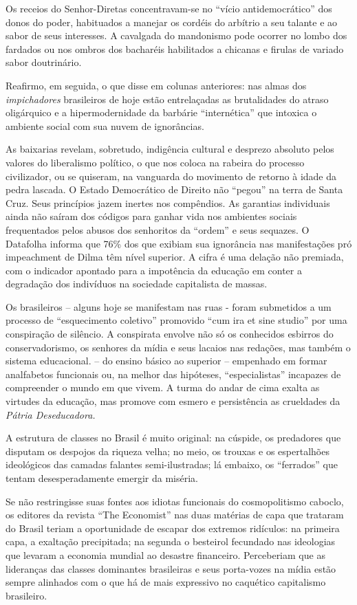 Os receios do Senhor-Diretas concentravam-se no ``vício
antidemocrático'' dos donos do poder, habituados a manejar os cordéis do
arbítrio a seu talante e ao sabor de seus interesses. A cavalgada do
mandonismo pode ocorrer no lombo dos fardados ou nos ombros dos
bacharéis habilitados a chicanas e firulas de variado sabor doutrinário.

Reafirmo, em seguida, o que disse em colunas anteriores: nas almas dos
\emph{impichadores} brasileiros de hoje estão entrelaçadas as
brutalidades do atraso oligárquico e a hipermodernidade da barbárie
``internética'' que intoxica o ambiente social com sua nuvem de
ignorâncias.

As baixarias revelam, sobretudo, indigência cultural e desprezo absoluto
pelos valores do liberalismo político, o que nos coloca na rabeira do
processo civilizador, ou se quiseram, na vanguarda do movimento de
retorno à idade da pedra lascada. O Estado Democrático de Direito não
``pegou'' na terra de Santa Cruz. Seus princípios jazem inertes nos
compêndios. As garantias individuais ainda não saíram dos códigos para
ganhar vida nos ambientes sociais frequentados pelos abusos dos
senhoritos da ``ordem'' e seus sequazes. O Datafolha informa que 76\%
dos que exibiam sua ignorância nas manifestações pró impeachment de
Dilma têm nível superior. A cifra é uma delação não premiada, com o
indicador apontado para a impotência da educação em conter a degradação
dos indivíduos na sociedade capitalista de massas.

Os brasileiros -- alguns hoje se manifestam nas ruas - foram submetidos
a um processo de ``esquecimento coletivo'' promovido ``cum ira et sine
studio'' por uma conspiração de silêncio. A conspirata envolve não só os
conhecidos esbirros do conservadorismo, os senhores da mídia e seus
lacaios nas redações, mas também o sistema educacional. -- do ensino
básico ao superior -- empenhado em formar analfabetos funcionais ou, na
melhor das hipóteses, ``especialistas'' incapazes de compreender o mundo
em que vivem. A turma do andar de cima exalta as virtudes da educação,
mas promove com esmero e persistência as crueldades da \emph{Pátria
Deseducadora.}

A estrutura de classes no Brasil é muito original: na cúspide, os
predadores que disputam os despojos da riqueza velha; no meio, os
trouxas e os espertalhões ideológicos das camadas falantes
semi-ilustradas; lá embaixo, os ``ferrados'' que tentam desesperadamente
emergir da miséria.

Se não restringisse suas fontes aos idiotas funcionais do cosmopolitismo
caboclo, os editores da revista ``The Economist'' nas duas matérias de
capa que trataram do Brasil teriam a oportunidade de escapar dos
extremos ridículos: na primeira capa, a exaltação precipitada; na
segunda o besteirol fecundado nas ideologias que levaram a economia
mundial ao desastre financeiro. Perceberiam que as lideranças das
classes dominantes brasileiras e seus porta-vozes na mídia estão sempre
alinhados com o que há de mais expressivo no caquético capitalismo
brasileiro.

